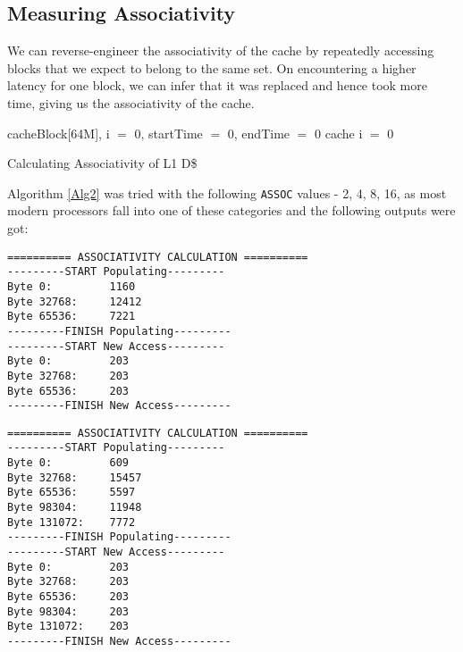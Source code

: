 \documentclass[12pt,a4paper,english]{paper}
\newenvironment{colorboxed}[4][gray]{
\begin{tcolorbox}[colback=#1!3!white,colframe=#1(ryb)!50!black,title=\textbf{#2 #3},#4]
}{
\end{tcolorbox}
}
\begin{document}
\subsection{Measuring Associativity}
We can reverse-engineer the associativity of the cache by repeatedly accessing blocks that we expect to belong to the same set. On encountering a higher latency for one block, we can infer that it was replaced and hence took more time, giving us the associativity of the cache.

\begin{algorithm}[H]
\SetAlgoLined
{}
  \init cacheBlock[64M], i $=$ 0, startTime $=$ 0, endTime $=$ 0\; 
  \clear cache\;
     \reset i $=$ 0\;
 \caption{Calculating Associativity of L1 D\$}
    \label{Alg2}
\end{algorithm}

Algorithm \ref{Alg2} was tried with the following \texttt{ASSOC} values - 2, 4, 8, 16, as most modern processors fall into one of these categories and the following outputs were got:

\begin{colorboxed}{Output: }{\texttt{\textbf{ASSOC = 2}}}{breakable}
\begin{verbatim}
========== ASSOCIATIVITY CALCULATION ==========
---------START Populating---------
Byte 0:         1160
Byte 32768:     12412
Byte 65536:     7221
---------FINISH Populating---------
---------START New Access---------
Byte 0:         203
Byte 32768:     203
Byte 65536:     203
---------FINISH New Access---------
\end{verbatim}
\end{colorboxed}

\begin{colorboxed}{Output: }{\texttt{\textbf{ASSOC = 4}}}{breakable}
\begin{verbatim}
========== ASSOCIATIVITY CALCULATION ==========
---------START Populating---------
Byte 0:         609
Byte 32768:     15457
Byte 65536:     5597
Byte 98304:     11948
Byte 131072:    7772
---------FINISH Populating---------
---------START New Access---------
Byte 0:         203
Byte 32768:     203
Byte 65536:     203
Byte 98304:     203
Byte 131072:    203
---------FINISH New Access---------
\end{verbatim}
\end{colorboxed}
\end{document}
